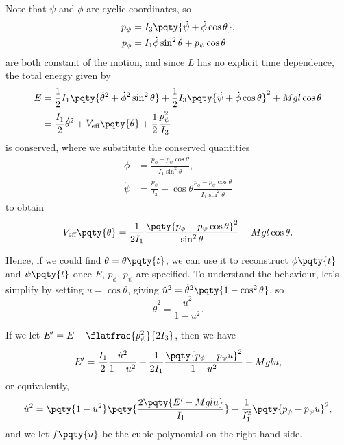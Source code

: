 Note that \(\psi\) and \(\phi\) are cyclic coordinates, so
\begin{subequations}
    \begin{align}
        p_{\psi} &= I_3 \pqty{\dot{\psi} + \dot{\phi} \cos \theta}, \\
        p_{\phi} &= I_1 \dot{\phi} \sin^2 \theta + p_\psi \cos \theta
    \end{align}
\end{subequations}
are both constant of the motion, and since \(L\) has no explicit time dependence, the total energy given by
\begin{subequations}
    \begin{align}
        E &= \frac{1}{2} I_1 \pqty{\dot{\theta}^2 + \dot{\phi}^2 \sin^2 \theta} + \frac{1}{2} I_3 \pqty{\dot{\psi} + \dot{\phi} \cos \theta}^2 + M g l \cos \theta \\
        &= \frac{I_1}{2} \dot{\theta}^2 + V_{\text{eff}} \pqty{\theta} + \frac{1}{2} \frac{p_\psi^2}{I_3}
    \end{align}
\end{subequations}
is conserved, where we substitute the conserved quantities
\begin{subequations}
    \begin{align}
        \dot{\phi} &= \frac{p_\phi - p_\psi \cos \theta}{I_1 \sin^2 \theta}, \\
        \dot{\psi} &= \frac{p_\psi}{I_3} - \cos \theta \frac{p_\phi - p_\psi \cos \theta}{I_1 \sin^2 \theta}
    \end{align}
\end{subequations}
to obtain
\begin{equation}
    V_{\text{eff}} \pqty{\theta} = \frac{1}{2 I_1} \frac{\pqty{p_\phi - p_\psi \cos \theta}^2}{\sin^2 \theta} + M g l \cos \theta.
\end{equation}

Hence, if we could find \(\theta = \theta\pqty{t}\), we can use it to reconstruct \(\phi\pqty{t}\) and \(\psi\pqty{t}\) once \(E\), \(p_{\phi}\), \(p_\psi\) are specified. To understand the behaviour, let's simplify by setting \(u = \cos \theta\), giving \(\dot{u}^2 = \dot{\theta}^2 \pqty{1 - \cos^2 \theta}\), so
\begin{equation}
    \dot{\theta}^2 = \frac{\dot{u}^2}{1 - u^2}.
\end{equation}

If we let \(E' = E - \flatfrac{p_\psi^2}{2 I_3}\), then we have
\begin{equation}
    E' = \frac{I_1}{2} \frac{\dot{u}^2}{1 - u^2} + \frac{1}{2 I_1} \frac{\pqty{p_\phi - p_\psi u}^2}{1 - u^2} + M g l u,
\end{equation}
or equivalently,
\begin{equation}
    \dot{u}^2 = \pqty{1 - u^2} \pqty{\frac{2 \pqty{E' - M g l u}}{I_1}} - \frac{1}{I_1^2} \pqty{p_\phi - p_\psi u}^2,
\end{equation}
and we let \(f\pqty{u}\) be the cubic polynomial on the right-hand side.

